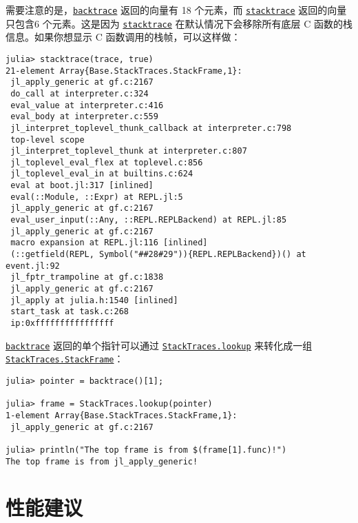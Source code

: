 需要注意的是，\hyperlink{6187626674327343338}{\texttt{backtrace}} 返回的向量有 18 个元素，而 \hyperlink{11964270650763140298}{\texttt{stacktrace}} 返回的向量只包含6 个元素。这是因为 \hyperlink{11964270650763140298}{\texttt{stacktrace}} 在默认情况下会移除所有底层 C 函数的栈信息。如果你想显示 C 函数调用的栈帧，可以这样做：




\begin{verbatim}
julia> stacktrace(trace, true)
21-element Array{Base.StackTraces.StackFrame,1}:
 jl_apply_generic at gf.c:2167
 do_call at interpreter.c:324
 eval_value at interpreter.c:416
 eval_body at interpreter.c:559
 jl_interpret_toplevel_thunk_callback at interpreter.c:798
 top-level scope
 jl_interpret_toplevel_thunk at interpreter.c:807
 jl_toplevel_eval_flex at toplevel.c:856
 jl_toplevel_eval_in at builtins.c:624
 eval at boot.jl:317 [inlined]
 eval(::Module, ::Expr) at REPL.jl:5
 jl_apply_generic at gf.c:2167
 eval_user_input(::Any, ::REPL.REPLBackend) at REPL.jl:85
 jl_apply_generic at gf.c:2167
 macro expansion at REPL.jl:116 [inlined]
 (::getfield(REPL, Symbol("##28#29")){REPL.REPLBackend})() at event.jl:92
 jl_fptr_trampoline at gf.c:1838
 jl_apply_generic at gf.c:2167
 jl_apply at julia.h:1540 [inlined]
 start_task at task.c:268
 ip:0xffffffffffffffff
\end{verbatim}



\hyperlink{6187626674327343338}{\texttt{backtrace}} 返回的单个指针可以通过 \hyperlink{1451426077045795515}{\texttt{StackTraces.lookup}} 来转化成一组 \hyperlink{16824886840215699957}{\texttt{StackTraces.StackFrame}}：




\begin{verbatim}
julia> pointer = backtrace()[1];

julia> frame = StackTraces.lookup(pointer)
1-element Array{Base.StackTraces.StackFrame,1}:
 jl_apply_generic at gf.c:2167

julia> println("The top frame is from $(frame[1].func)!")
The top frame is from jl_apply_generic!
\end{verbatim}



\hypertarget{3908315974291496321}{}


\chapter{性能建议}



